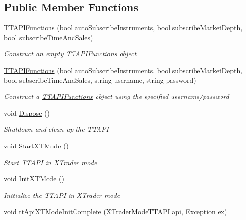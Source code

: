 \subsection*{Public Member Functions}
\begin{DoxyCompactItemize}
\item 
\hyperlink{class_e_z_a_p_i_1_1_t_t_a_p_i_functions_a2760d5cc3dc3edbfb39343cbafce3f03}{T\-T\-A\-P\-I\-Functions} (bool auto\-Subscribe\-Instruments, bool subscribe\-Market\-Depth, bool subscribe\-Time\-And\-Sales)
\begin{DoxyCompactList}\small\item\em Construct an empty \hyperlink{class_e_z_a_p_i_1_1_t_t_a_p_i_functions}{T\-T\-A\-P\-I\-Functions} object \end{DoxyCompactList}\item 
\hyperlink{class_e_z_a_p_i_1_1_t_t_a_p_i_functions_a4fd760f106af454949316283c1258c20}{T\-T\-A\-P\-I\-Functions} (bool auto\-Subscribe\-Instruments, bool subscribe\-Market\-Depth, bool subscribe\-Time\-And\-Sales, string username, string password)
\begin{DoxyCompactList}\small\item\em Construct a \hyperlink{class_e_z_a_p_i_1_1_t_t_a_p_i_functions}{T\-T\-A\-P\-I\-Functions} object using the specified username/password \end{DoxyCompactList}\item 
void \hyperlink{class_e_z_a_p_i_1_1_t_t_a_p_i_functions_a7c2be102d31ca7b07e43715551fc9c89}{Dispose} ()
\begin{DoxyCompactList}\small\item\em Shutdown and clean up the T\-T\-A\-P\-I \end{DoxyCompactList}\item 
void \hyperlink{class_e_z_a_p_i_1_1_t_t_a_p_i_functions_ac19b8330185ee424edd79aabe8f052aa}{Start\-X\-T\-Mode} ()
\begin{DoxyCompactList}\small\item\em Start T\-T\-A\-P\-I in X\-Trader mode \end{DoxyCompactList}\item 
void \hyperlink{class_e_z_a_p_i_1_1_t_t_a_p_i_functions_aefd00d47e6002a58725e19568968ee6e}{Init\-X\-T\-Mode} ()
\begin{DoxyCompactList}\small\item\em Initialize the T\-T\-A\-P\-I in X\-Trader mode \end{DoxyCompactList}\item 
void \hyperlink{class_e_z_a_p_i_1_1_t_t_a_p_i_functions_a585ec57b8001bf532c138dc0e1afebf8}{tt\-Api\-X\-T\-Mode\-Init\-Complete} (X\-Trader\-Mode\-T\-T\-A\-P\-I api, Exception ex)

\end{DoxyCompactItemize}
